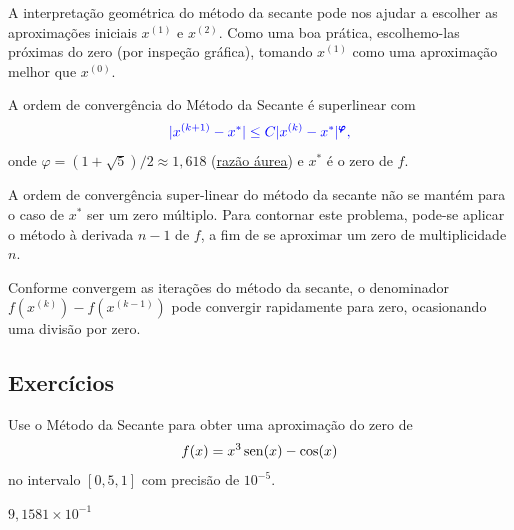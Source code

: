 \begin{obs}
  A interpretação geométrica do método da secante pode nos ajudar a escolher as aproximações iniciais $x^{(1)}$ e $x^{(2)}$. Como uma boa prática, escolhemo-las próximas do zero (por inspeção gráfica), tomando $x^{(1)}$ como uma aproximação melhor que $x^{(0)}$. 
\end{obs}

\begin{obs}
  A ordem de convergência do Método da Secante é superlinear com
  \begin{equation}\color{blue}|x^{(k+1)}-x^*| \leq C|x^{(k)}-x^*|^{\pmb{\varphi}},
  \end{equation}
  onde $\varphi = (1+\sqrt{5})/2\approx 1,618$ (\href{https://pt.wikipedia.org/wiki/Propor%C3%A7%C3%A3o_%C3%A1urea}{razão áurea}) e $x^*$ é o zero de $f$.
\end{obs}

\begin{obs}
  A ordem de convergência super-linear do método da secante não se mantém para o caso de $x^*$ ser um zero múltiplo. Para contornar este problema, pode-se aplicar o método à derivada $n-1$ de $f$, a fim de se aproximar um zero de multiplicidade $n$.
\end{obs}

\begin{obs}
  Conforme convergem as iterações do método da secante, o denominador $f(x^{(k)})-f(x^{(k-1)})$ pode convergir rapidamente para zero, ocasionando uma divisão por zero.
\end{obs}


\subsection*{Exercícios}

\begin{exer}
  Use o Método da Secante para obter uma aproximação do zero de
  \begin{equation}
    f(x)=x^3\operatorname{sen}(x)-\cos(x)
  \end{equation}
  no intervalo $[0,5, 1]$ com precisão de $10^{-5}$.
\end{exer}
\begin{resp}
  $9,1581\times 10^{-1}$
\end{resp}


